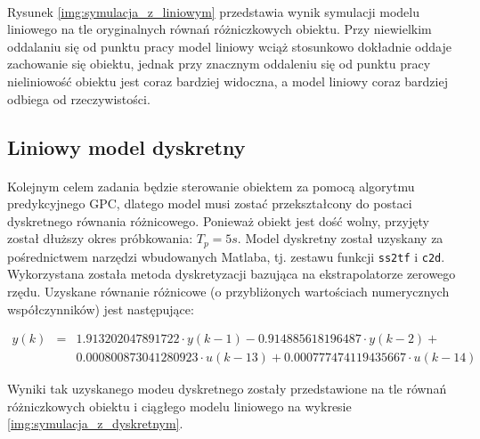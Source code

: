 \documentclass[a4paper,12pt]{article}
\begin{document}
\paragraph{}
Rysunek \ref{img:symulacja_z_liniowym} przedstawia wynik symulacji modelu liniowego na tle oryginalnych równań różniczkowych obiektu.
Przy niewielkim oddalaniu się od punktu pracy model liniowy wciąż stosunkowo dokładnie oddaje zachowanie się obiektu, jednak przy znacznym oddaleniu się od punktu pracy nieliniowość obiektu jest coraz bardziej widoczna, a model liniowy coraz bardziej odbiega od rzeczywistości.

\newpage
\subsection{Liniowy model dyskretny}
\paragraph{}
Kolejnym celem zadania będzie sterowanie obiektem za pomocą algorytmu predykcyjnego GPC, dlatego model musi zostać przekształcony do postaci dyskretnego równania różnicowego.
Ponieważ obiekt jest dość wolny, przyjęty został dłuższy okres próbkowania: $T_p=5s$.
Model dyskretny został uzyskany za pośrednictwem narzędzi wbudowanych Matlaba, tj. zestawu funkcji \texttt{ss2tf} i \texttt{c2d}.
Wykorzystana została metoda dyskretyzacji bazująca na ekstrapolatorze zerowego rzędu.
Uzyskane równanie różnicowe (o przybliżonych wartościach numerycznych współczynników) jest następujące:

\begin{equation}
   \begin{array}{lcl}
   y(k) & = & 1.913202047891722 \cdot y(k-1) - 0.914885618196487 \cdot y(k-2) + \\[0.1cm]
   ~ & ~ & 0.000800873041280923 \cdot u(k-13) + 0.000777474119435667 \cdot u(k-14)
   \end{array}
\end{equation}

\noindent Wyniki tak uzyskanego modeu dyskretnego zostały przedstawione na tle równań różniczkowych obiektu i ciągłego modelu liniowego na wykresie \ref{img:symulacja_z_dyskretnym}.
\end{document}
